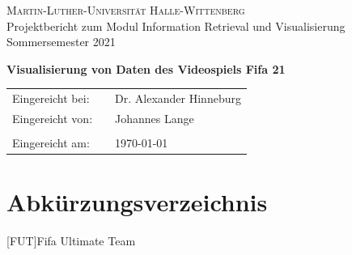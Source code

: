 \documentclass[usegeometry=true]{scrartcl}
\begin{document}

\begin{titlepage}
	\begin{center}
		\large{\textsc{Martin-Luther-Universität Halle-Wittenberg}}\\
				

		Projektbericht zum Modul Information Retrieval und Visualisierung Sommersemester 2021
	\end{center}

	\begin{center}
		\Large
		\textbf{Visualisierung von Daten des Videospiels Fifa 21}
	\end{center}

	\vskip 1cm

	\vskip 0.75cm

	\begin{center}
		\begin{tabular}{lll}
			Eingereicht bei:& & Dr. Alexander Hinneburg\\
			Eingereicht von:  & & Johannes Lange \\
			& & \\
			Eingereicht am: & & \today
		\end{tabular}
	\end{center}

\end{titlepage}




\newpage
\tableofcontents
\newpage

\clearpage
\listoffigures

\section*{Abkürzungsverzeichnis}\label{AV}
	\begin{acronym}
	[FUT]{Fifa Ultimate Team}
	\end{acronym}
\newpage
\end{document}
